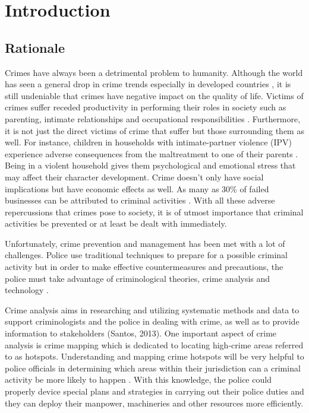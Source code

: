 
\chapter{Introduction}  %

\section{Rationale} %

    Crimes have always been a detrimental problem to humanity. Although the world has seen a general drop in crime trends especially in developed countries \cite{dijk2007criminal}, it is still undeniable that crimes have negative impact on the quality of life. Victims of crimes suffer receded productivity in performing their roles in society such as parenting, intimate relationships and occupational responsibilities \cite{hanson2010impact}. Furthermore, it is not just the direct victims of crime that suffer but those surrounding them as well. For instance, children in households with intimate-partner violence (IPV) experience adverse consequences from the maltreatment to one of their parents \cite{casanueva2008quality}. Being in a violent household gives them psychological and emotional stress that may affect their character development. Crime doesn’t only have social implications but have economic effects as well. As many as 30\% of failed businesses can be attributed to criminal activities \cite{bressler2009impact}. With all these adverse repercussions that crimes pose to society, it is of utmost importance that criminal activities be prevented or at least be dealt with immediately.

    Unfortunately, crime prevention and management has been met with a lot of challenges. Police use traditional techniques to prepare for a possible criminal activity but in order to make effective countermeasures and precautions, the police must take advantage of criminological theories, crime analysis and technology \cite{polat2007spatio}.

    Crime analysis aims in researching and utilizing systematic methods and data to support criminologists and the police in dealing with crime, as well as to provide information to stakeholders (Santos, 2013). One important aspect of crime analysis is crime mapping which is dedicated to locating high-crime areas referred to as hotspots. Understanding and mapping crime hotspots will be very helpful to police officials in determining which areas within their jurisdiction can a criminal activity be more likely to happen \cite{eck2005mapping}. With this knowledge, the police could properly device special plans and strategies in carrying out their police duties and they can deploy their manpower, machineries and other resources more efficiently.

